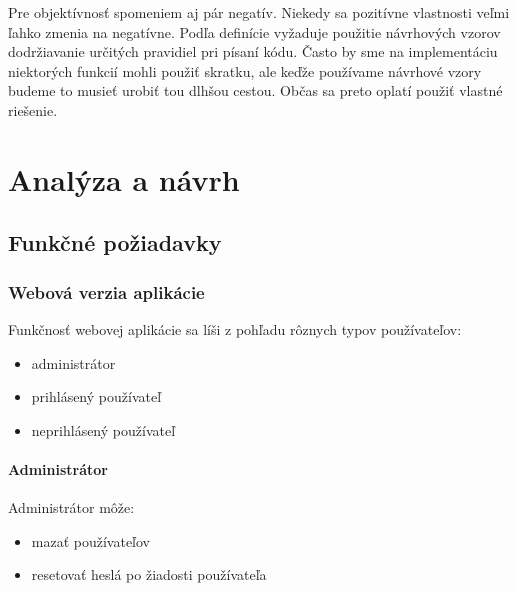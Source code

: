 \documentclass[12pt,onesided]{book}
\begin{document}
Pre objektívnosť spomeniem aj pár negatív. Niekedy sa pozitívne vlastnosti veľmi ľahko zmenia na negatívne. Podľa definície vyžaduje použitie návrhových vzorov dodržiavanie určitých pravidiel pri písaní kódu. Často by sme na implementáciu niektorých funkcií mohli použiť skratku, ale keďže používame návrhové vzory budeme to musieť urobiť tou dlhšou cestou. Občas sa preto oplatí použiť vlastné riešenie.

\chapter{Analýza a návrh}
\section{Funkčné požiadavky}
\subsection{Webová verzia aplikácie}
Funkčnosť webovej aplikácie sa líši z pohľadu rôznych typov používateľov:
\begin{itemize}
\item{administrátor}
\item{prihlásený používateľ}
\item{neprihlásený používateľ}
\end{itemize}

\subsubsection{Administrátor}
Administrátor môže:
\begin{itemize}
\item{mazať používateľov}
\item{resetovať heslá po žiadosti používateľa}
\end{itemize}
\end{document}
